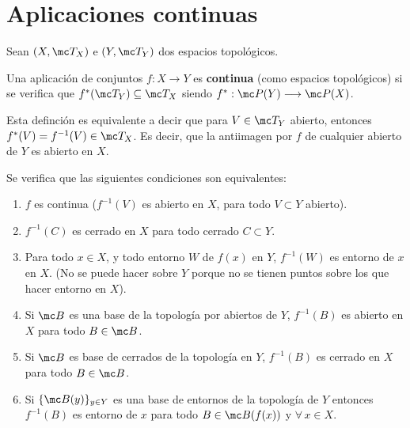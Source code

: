 \chapter{Aplicaciones continuas} \justifying
Sean $(X, \mc T_X)$ e $(Y, \mc T_Y)$ dos espacios topol\'ogicos.
\begin{defi}
    Una aplicaci\'on de conjuntos $f: X\longrightarrow Y$ es \textbf{continua} (como espacios topol\'ogicos) si se verifica que $f^*(\mc T_Y) \subseteq \mc T_X$ siendo $f^* : \mc P(Y) \longrightarrow \mc P(X)$. 
\end{defi}
\begin{obs}
    Esta definci\'on es equivalente a decir que para $V \in \mc T_Y$ abierto, entonces $f^*(V) = f^{-1}(V) \in \mc T_X$. Es decir, que la antiimagen por $f$ de cualquier abierto de $Y$ es abierto en $X$. 
\end{obs}
\begin{prop}
    Se verifica que las siguientes condiciones son equivalentes:
    \begin{enumerate}
        \item $f$ es continua ($f^{-1}(V)$ es abierto en $X$, para todo $V\subset Y$  abierto). 
        \item $f^{-1}(C)$ es cerrado en $X$ para todo cerrado $C\subset Y$.
        \item Para todo $x\in X$, y todo entorno $W$ de $f(x)$ en $Y$, $f^{-1}(W)$ es entorno de $x$ en $X$. (No se puede hacer sobre $Y$ porque no se tienen puntos sobre los que hacer entorno en $X$).
        \item Si $\mc B$ es una base de la topolog\'ia por abiertos de $Y$, $f^{-1}(B) $ es abierto en $X$ para todo $B \in \mc B$. 
        \item Si $\mc B$ es base de cerrados de la topolog\'ia en $Y$, $f^{-1}(B)$ es cerrado en $X$ para todo $B\in \mc B$.
        \item Si $\{\mc B(y)\}_{y \in Y}$ es una base de entornos de la topolog\'ia de $Y$ entonces $f^{-1}(B)$ es entorno de $x$ para todo $B \in \mc B(f(x))$ y $\forall \, x \in X$.  
    \end{enumerate}
\end{prop}
